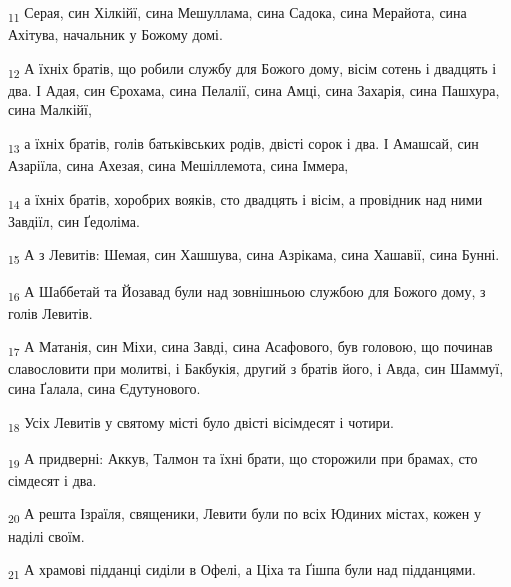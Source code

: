 \begin{tcolorbox}
\textsubscript{11} Серая, син Хілкійї, сина Мешуллама, сина Садока, сина Мерайота, сина Ахітува, начальник у Божому домі.
\end{tcolorbox}
\begin{tcolorbox}
\textsubscript{12} А їхніх братів, що робили службу для Божого дому, вісім сотень і двадцять і два. І Адая, син Єрохама, сина Пелалії, сина Амці, сина Захарія, сина Пашхура, сина Малкійї,
\end{tcolorbox}
\begin{tcolorbox}
\textsubscript{13} а їхніх братів, голів батьківських родів, двісті сорок і два. І Амашсай, син Азаріїла, сина Ахезая, сина Мешіллемота, сина Іммера,
\end{tcolorbox}
\begin{tcolorbox}
\textsubscript{14} а їхніх братів, хоробрих вояків, сто двадцять і вісім, а провідник над ними Завдіїл, син Ґедоліма.
\end{tcolorbox}
\begin{tcolorbox}
\textsubscript{15} А з Левитів: Шемая, син Хашшува, сина Азрікама, сина Хашавії, сина Бунні.
\end{tcolorbox}
\begin{tcolorbox}
\textsubscript{16} А Шаббетай та Йозавад були над зовнішньою службою для Божого дому, з голів Левитів.
\end{tcolorbox}
\begin{tcolorbox}
\textsubscript{17} А Матанія, син Міхи, сина Завді, сина Асафового, був головою, що починав славословити при молитві, і Бакбукія, другий з братів його, і Авда, син Шаммуї, сина Ґалала, сина Єдутунового.
\end{tcolorbox}
\begin{tcolorbox}
\textsubscript{18} Усіх Левитів у святому місті було двісті вісімдесят і чотири.
\end{tcolorbox}
\begin{tcolorbox}
\textsubscript{19} А придверні: Аккув, Талмон та їхні брати, що сторожили при брамах, сто сімдесят і два.
\end{tcolorbox}
\begin{tcolorbox}
\textsubscript{20} А решта Ізраїля, священики, Левити були по всіх Юдиних містах, кожен у наділі своїм.
\end{tcolorbox}
\begin{tcolorbox}
\textsubscript{21} А храмові підданці сиділи в Офелі, а Ціха та Ґішпа були над підданцями.
\end{tcolorbox}
